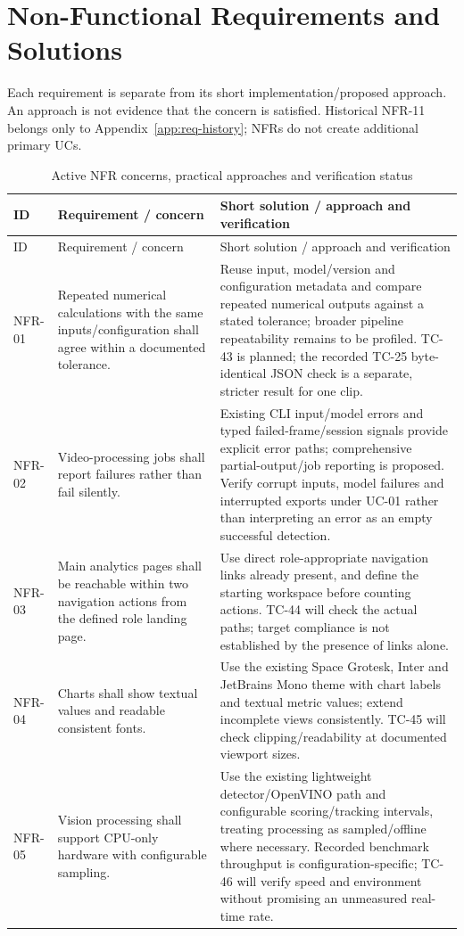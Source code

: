\section{Non-Functional Requirements and Solutions}
Each requirement is separate from its short implementation/proposed approach. An approach is not evidence that the concern is satisfied. Historical NFR-11 belongs only to Appendix~\ref{app:req-history}; NFRs do not create additional primary UCs.
\begin{longtable}{P{0.09\textwidth}P{0.30\textwidth}P{0.51\textwidth}}
\caption{Active NFR concerns, practical approaches and verification status}\label{tab:nfr-solutions}\\
\toprule
ID & Requirement / concern & Short solution / approach and verification\\
\midrule
\endfirsthead
\toprule
ID & Requirement / concern & Short solution / approach and verification\\
\midrule
\endhead
NFR-01 & Repeated numerical calculations with the same inputs/configuration shall agree within a documented tolerance. & Reuse input, model/version and configuration metadata and compare repeated numerical outputs against a stated tolerance; broader pipeline repeatability remains to be profiled. TC-43 is planned; the recorded TC-25 byte-identical JSON check is a separate, stricter result for one clip.\\
NFR-02 & Video-processing jobs shall report failures rather than fail silently. & Existing CLI input/model errors and typed failed-frame/session signals provide explicit error paths; comprehensive partial-output/job reporting is proposed. Verify corrupt inputs, model failures and interrupted exports under UC-01 rather than interpreting an error as an empty successful detection.\\
NFR-03 & Main analytics pages shall be reachable within two navigation actions from the defined role landing page. & Use direct role-appropriate navigation links already present, and define the starting workspace before counting actions. TC-44 will check the actual paths; target compliance is not established by the presence of links alone.\\
NFR-04 & Charts shall show textual values and readable consistent fonts. & Use the existing Space Grotesk, Inter and JetBrains Mono theme with chart labels and textual metric values; extend incomplete views consistently. TC-45 will check clipping/readability at documented viewport sizes.\\
NFR-05 & Vision processing shall support CPU-only hardware with configurable sampling. & Use the existing lightweight detector/OpenVINO path and configurable scoring/tracking intervals, treating processing as sampled/offline where necessary. Recorded benchmark throughput is configuration-specific; TC-46 will verify speed and environment without promising an unmeasured real-time rate.\\

\end{longtable}
